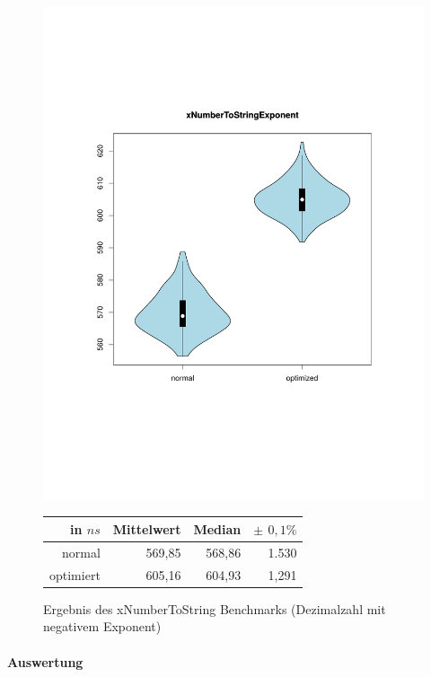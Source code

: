 \begin{figure}[H]
{		\includegraphics[trim=20mm 60mm 0mm 50mm,scale=0.50]{pictures/vioplot_xNumberToStringExponent.pdf}
	}

	\begin{table}[H]
	\centering
		\begin{tabular}{|r|r|r|r|}
			\hline
		   	in $ns$   & Mittelwert & Median & \bf{$\pm$ $0,1\%$} \\
		 	\hline
		 	\hline
		  	normal 	  & 569,85 & 568,86 & 1.530 \\
		 	optimiert & 605,16 & 604,93 & 1,291 \\ 
		  	\hline
		  	
		\end{tabular}
	\end{table}

	\caption{Ergebnis des xNumberToString Benchmarks (Dezimalzahl mit negativem Exponent)}\label{bp:xNumExp}
\end{figure}

\paragraph{Auswertung}


